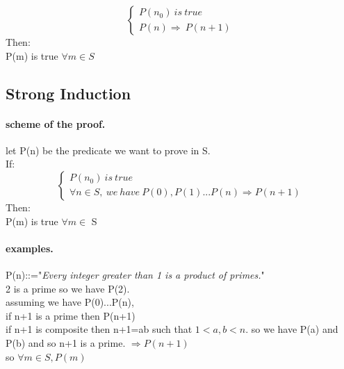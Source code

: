 \documentclass[10pt]{article}
\begin{document}
			
			\[
			\begin{cases}
			P(n_0)\ is\ true\\
			P(n)\Rightarrow\ P(n+1) 
			\end{cases}
				\]
			Then:\\
			P(m) is true $ \forall m \in S $
		\subsection{Strong Induction}
			\paragraph{scheme of the proof.}
			let P(n) be the predicate we want to prove in S.\\If:\\
			\[
			\begin{cases}
			P(n_0)\ is\ true\\
			\forall n \in S,\ we\ have\ P(0),P(1)...P(n)\Rightarrow P(n+1)
			\end{cases}
			\]
			Then:\\
			P(m) is true $\forall m\in$ S
			\paragraph{examples.}P(n)::="\emph{Every integer greater than 1 is a product of primes.}"\\
				2 is a prime so we have P(2).\\
				assuming we have P(0)...P(n),\\
				if n+1 is a prime then P(n+1)\\
				if n+1 is composite then n+1=ab such that $1<a,b<n$. so we have P(a) and P(b) and so n+1 is a prime.
				$ \Rightarrow P(n+1)$\\
				so $ \forall m \in S,P(m) $
\end{document}
